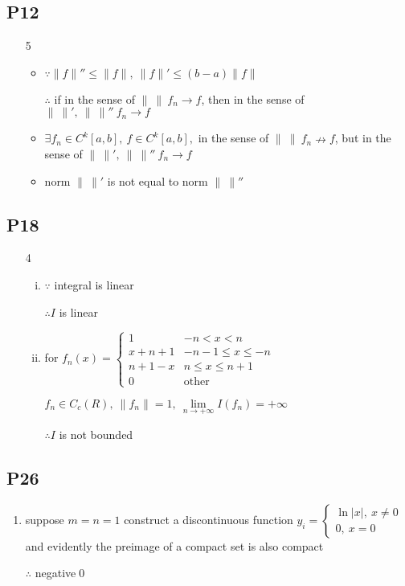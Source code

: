\subsection{P12}
\begin{enumerate}[1]
    \item[5] 
    \begin{itemize}
        \item $\because \|f\|''\leq\|f\|,\ \|f\|'\leq(b-a)\|f\|$
        \par $\therefore $ if in the sense of $\|\ \|\ f_n \to f $, then in the sense of $\|\ \|',\ \|\ \|''\ f_n \to f $
        \item $ \exists f_n \in C^k[a,b],\ f\in C^k[a,b] ,$ in the sense of $\|\ \|\ f_n \nrightarrow f $, but in the sense of $\|\ \|',\ \|\ \|''\ f_n \to  f $ 
        \item norm $\|\ \|'$ is not equal to norm $\|\ \|''$
    \end{itemize}

\end{enumerate}


\subsection{P18}
\begin{enumerate}[1]
    \item[4] 
    \begin{enumerate}[(i)]
        \item 
        $\because $ integral is linear
        \par $\therefore I$ is linear
        \item 
        \par for $f_n(x)=\begin{cases} 1&-n<x<n\\
            x+n+1&-n-1\leqslant x\leqslant -n\\
            n+1-x&n\leqslant x\leqslant n+1\\
            0&\mathrm{other} 
        \end{cases}$
        \par $f_n\in C_c(R),\ \|f_n\|=1,\ \lim \limits_{n \to + \infty} I(f_n) = +\infty $ 
        \par $ \therefore I $ is not bounded
    \end{enumerate} 
    
\end{enumerate}

\subsection{P26}
\begin{enumerate}[5]
    \item
    suppose $m=n=1$ construct a discontinuous function $y_i=
    \begin{cases} \ln|x|,\ x\neq 0 \\ 0,\ x=0
    \end{cases}$ and evidently the preimage of a compact set is also compact 
    \par $\therefore$ negative\qed
\end{enumerate}

